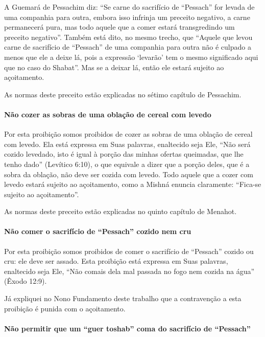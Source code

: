 A Guemará de Pessachim diz: ``Se carne do sacrifício de ``Pessach'' for
levada de uma companhia para outra, embora isso
infrinja um preceito negativo, a carne permanecerá pura, mas todo aquele
que a comer estará transgredindo um preceito negativo''. Também está
dito, no mesmo trecho, que ``Aquele que levou carne de sacrifício de
``Pessach'' de uma companhia para outra não é
culpado a menos que ele a deixe lá, pois a expressão `levarão' tem o
mesmo significado aqui que no caso do Shabat''. Mas se a deixar lá,
então ele estará sujeito ao açoitamento.

As normas deste preceito estão explicadas no sétimo capítulo de Pessachim.

\paragraph{Não cozer as sobras de uma oblação de cereal com levedo}

Por esta proibição somos proibidos de cozer as sobras de uma oblação de
cereal com levedo. Ela está expressa em Suas palavras, enaltecido seja
Ele, ``Não será cozido levedado, isto é igual à porção das minhas
ofertas queimadas, que lhe tenho dado'' (Levítico 6:10), o que equivale
a dizer que a porção deles, que é a sobra da oblação, não deve ser
cozida com levedo. Todo aquele que a cozer com levedo estará sujeito ao
açoitamento, como a Mishná enuncia claramente: ``Fica-se sujeito ao
açoitamento''.

As normas deste preceito estão explicadas no quinto capítulo de Menahot.

\paragraph{Não comer o sacrifício de ``Pessach'' cozido nem cru}

Por esta proibição somos proibidos de comer o sacrifício de ``Pessach''
cozido ou cru: ele deve ser assado. Esta proibição está expressa em Suas
palavras, enaltecido seja Ele, ``Não comais dela mal passada no fogo nem
cozida na água'' (Êxodo 12:9).

Já expliquei no Nono Fundamento deste trabalho que a contravenção a
esta proibição é punida com o açoitamento.

\paragraph{Não permitir que um ``guer toshab'' coma do sacrifício de ``Pessach''}

